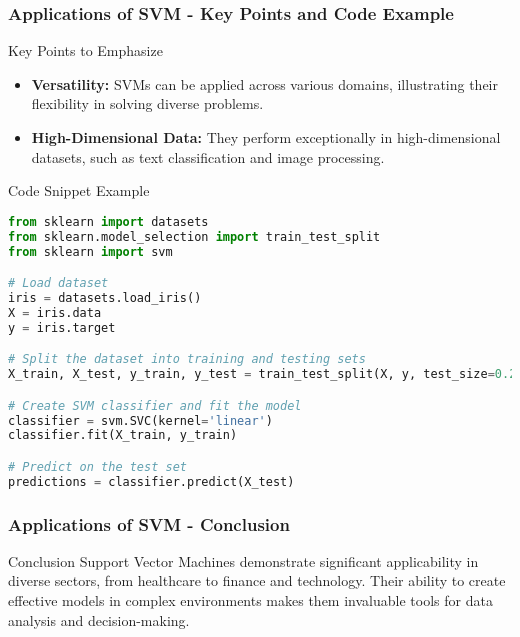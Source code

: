 \documentclass{beamer}
\begin{document}
\begin{frame}[fragile]
    \frametitle{Applications of SVM - Key Points and Code Example}
    \begin{block}{Key Points to Emphasize}
        \begin{itemize}
            \item \textbf{Versatility:} SVMs can be applied across various domains, illustrating their flexibility in solving diverse problems.
            \item \textbf{High-Dimensional Data:} They perform exceptionally in high-dimensional datasets, such as text classification and image processing.
        \end{itemize}
    \end{block}

    \begin{block}{Code Snippet Example}
    \begin{lstlisting}[language=Python]
from sklearn import datasets
from sklearn.model_selection import train_test_split
from sklearn import svm

# Load dataset
iris = datasets.load_iris()
X = iris.data
y = iris.target

# Split the dataset into training and testing sets
X_train, X_test, y_train, y_test = train_test_split(X, y, test_size=0.2, random_state=42)

# Create SVM classifier and fit the model
classifier = svm.SVC(kernel='linear')
classifier.fit(X_train, y_train)

# Predict on the test set
predictions = classifier.predict(X_test)
    \end{lstlisting}
    \end{block}
\end{frame}

\begin{frame}[fragile]
    \frametitle{Applications of SVM - Conclusion}
    \begin{block}{Conclusion}
        Support Vector Machines demonstrate significant applicability in diverse sectors, from healthcare to finance and technology. Their ability to create effective models in complex environments makes them invaluable tools for data analysis and decision-making.
    \end{block}
\end{frame}
\end{document}
